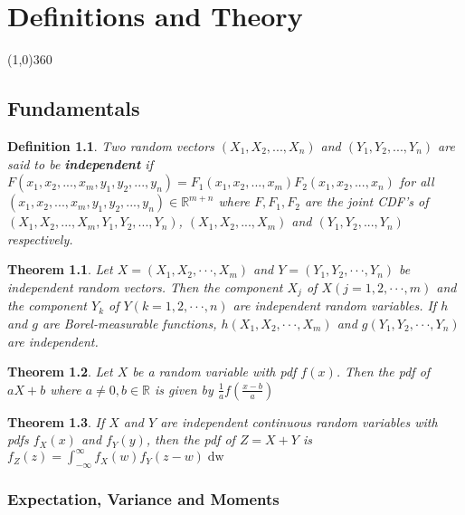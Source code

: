 \documentclass[12pt,twoside]{report}
\newtheorem{defn}{Definition}
\newtheorem{thm}{Theorem}
\begin{document}
\tableofcontents
\newpage
{}

\chapter{Definitions and Theory}
\line(1,0){360} \\

\section{Fundamentals}

\begin{defn}
    Two random vectors $(X_1, X_2, ..., X_n)$ and $(Y_1, Y_2, ..., Y_n)$ are said to be \textbf{independent} if $F(x_1, x_2, ..., x_m, y_1, y_2, ..., y_n) = F_1 (x_1, x_2, ..., x_m) F_2 (x_1, x_2, ..., x_n)$ for all $(x_1, x_2, ..., x_m, y_1, y_2, ..., y_n) \in \mathbb{R}^{m+n}$ where $F, F_1, F_2$ are the joint CDF's of $(X_1, X_2, ..., X_m, Y_1, Y_2, ..., Y_n)$, $(X_1, X_2, ..., X_m)$ and $(Y_1, Y_2, ..., Y_n)$ respectively.
\end{defn}

\begin{thm}
    Let $X = (X_1, X_2, · · · , X_m)$ and $Y = (Y_1, Y_2, · · · , Y_n)$ be independent random vectors. Then the component $X_j$ of $X(j = 1, 2, · · · , m)$ and the component $Y_k$ of $Y(k = 1, 2, · · · , n)$ are independent random variables. If $h$ and $g$ are Borel-measurable functions, $h(X_1, X_2, · · · , X_m)$ and $g(Y_1, Y_2, · · · , Y_n)$ are independent.
\end{thm}

\begin{thm}
    Let $X$ be a random variable with pdf $f(x)$. Then the pdf of $aX+b$ where $a \neq 0, b \in \mathbb{R}$ is given by $\displaystyle \frac{1}{a} f \left (\frac{x-b}{a} \right)$
\end{thm}

\begin{thm}
    If $X$ and $Y$ are independent continuous random variables with pdfs $f_X(x)$ and $f_Y(y)$, then the pdf of $Z = X+Y$ is $f_Z\left (z\right ) = \displaystyle\int_{- \infty}^\infty f_X \left (w\right ) f_Y \left (z - w\right ) \mathop{\mathrm{d} w}$
\end{thm}


\subsection{Expectation, Variance and Moments}
\end{document}
